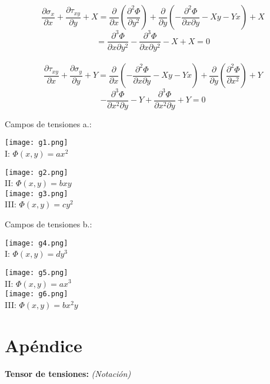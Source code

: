 \documentclass[a4paper,12pt,twoside,final,spanish]{article}
\begin{document}
\[
\frac{\partial\sigma_{x}}{\partial x}+\frac{\partial\tau_{xy}}{\partial y}+X=
\frac{\partial}{\partial x}\left(\frac{\partial^{2}\Phi}{\partial y^2}\right)+
\frac{\partial}{\partial y}\left(-\frac{\partial^2\Phi}{\partial x\partial y}-Xy-Yx\right)+X
\]
\[
=\frac{\partial^3\Phi}{\partial x\partial y^2}-\frac{\partial^3\Phi}{\partial x\partial y^2}-X+X=0
\]\\

\[
\frac{\partial\tau_{xy}}{\partial x}+\frac{\partial\sigma_{y}}{\partial y}+Y=
\frac{\partial}{\partial x}\left(-\frac{\partial^2\Phi}{\partial x\partial y}-Xy-Yx\right)+
\frac{\partial}{\partial y}\left(\frac{\partial^2\Phi}{\partial x^2}\right)+Y
\]
\[
-\frac{\partial^3\Phi}{\partial x^2\partial y}-Y+\frac{\partial^3\Phi}{\partial x^2\partial y}+Y=0
\]

Campos de tensiones a.:

\begin{center}
\texttt{[image: g1.png]}\\
I: $\Phi(x,y)=ax^2$

\texttt{[image: g2.png]}\\
II: $\Phi(x,y)=bxy$\\

\texttt{[image: g3.png]}\\
III: $\Phi(x,y)=cy^2$
\end{center}

Campos de tensiones b.:

\begin{center}
\texttt{[image: g4.png]}\\
I: $\Phi(x,y)=dy^3$

\texttt{[image: g5.png]}\\
II: $\Phi(x,y)=ax^3$\\

\texttt{[image: g6.png]}\\
III: $\Phi(x,y)=bx^{2}y$
\end{center}

\section*{Apéndice}

\textbf{Tensor de tensiones: }\textit{(Notación)}
\end{document}
